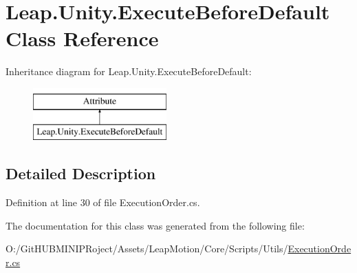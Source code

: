 \hypertarget{class_leap_1_1_unity_1_1_execute_before_default}{}\section{Leap.\+Unity.\+Execute\+Before\+Default Class Reference}
\label{class_leap_1_1_unity_1_1_execute_before_default}
Inheritance diagram for Leap.\+Unity.\+Execute\+Before\+Default\+:\begin{figure}[H]
\begin{center}
\leavevmode
\includegraphics[height=2.000000cm]{class_leap_1_1_unity_1_1_execute_before_default}
\end{center}
\end{figure}


\subsection{Detailed Description}


Definition at line 30 of file Execution\+Order.\+cs.



The documentation for this class was generated from the following file\+:\begin{DoxyCompactItemize}
\item 
O\+:/\+Git\+H\+U\+B\+M\+I\+N\+I\+P\+Roject/\+Assets/\+Leap\+Motion/\+Core/\+Scripts/\+Utils/\mbox{\hyperlink{_execution_order_8cs}{Execution\+Order.\+cs}}\end{DoxyCompactItemize}
